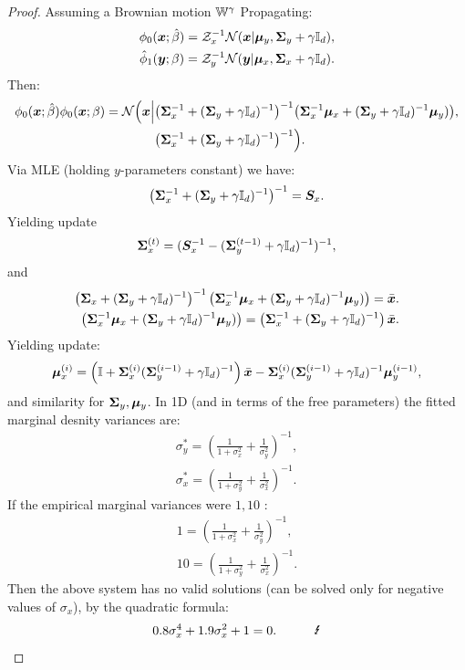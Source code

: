 \documentclass[a4paper,12pt,twoside,openright]{report}
\theoremstyle{definition}
\begin{document}
\begin{proof}
 Assuming a Brownian motion $\mathbb{W}^{\gamma}$ Propagating:
\begin{align*}
\phi_0( {\bm{x}} ; \hat{\beta}) = \mathcal{Z}_x^{-1} {\mathcal{N}}({\bm{x}}| {\bm{\mu}}_y, {\bm{\Sigma}}_y + \gamma {\mathbb{I}_d}),  \\
{{\hat{\phi}}}_1( {\bm{y}} ; {\beta}) = \mathcal{Z}_y^{-1}  {\mathcal{N}}({\bm{y}}| {\bm{\mu}}_x, {\bm{\Sigma}}_x + \gamma {\mathbb{I}_d}).
\end{align*}
Then:
\begin{align*}
 \phi_0( {\bm{x}} ; \hat{\beta})  \phi_0({\bm{x}} ; \beta) = {\mathcal{N}}\Big({\bm{x}} \Big|& \big({\bm{\Sigma}}_x^{-1} + ({\bm{\Sigma}}_y + \gamma {\mathbb{I}_d})^{-1}\big)^{-1}\big( {\bm{\Sigma}}_x^{-1}{\bm{\mu}}_x + ({\bm{\Sigma}}_y + \gamma {\mathbb{I}_d})^{-1}{\bm{\mu}}_y)\big), \\ &\big({\bm{\Sigma}}_x^{-1} + ({\bm{\Sigma}}_y + \gamma {\mathbb{I}_d})^{-1}\big)^{-1} \Big).
\end{align*}
Via MLE (holding $y$-parameters constant) we have:
\begin{align*}
\left({\bm{\Sigma}}_x^{-1} + ({\bm{\Sigma}}_y + \gamma {\mathbb{I}_d})^{-1}\right)^{-1}  = {\bm{S}}_x.
\end{align*}
Yielding update
\begin{align*}
{\bm{\Sigma}}_x^{(t)} = ({\bm{S}}_x^{-1}  - ({\bm{\Sigma}}_y^{(t-1)} + \gamma {\mathbb{I}_d})^{-1})^{-1} ,
\end{align*}
and 
\begin{align*}
\left({\bm{\Sigma}}_x + ({\bm{\Sigma}}_y + \gamma {\mathbb{I}_d})^{-1}\right)^{-1}\left( {\bm{\Sigma}}_x^{-1}{\bm{\mu}}_x + ({\bm{\Sigma}}_y + \gamma {\mathbb{I}_d})^{-1}{\bm{\mu}}_y)\right) = \bar{{\bm{x}}}. \\
\left( {\bm{\Sigma}}_x^{-1}{\bm{\mu}}_x + ({\bm{\Sigma}}_y + \gamma {\mathbb{I}_d})^{-1}{\bm{\mu}}_y)\right) = \left({\bm{\Sigma}}_x^{-1} + ({\bm{\Sigma}}_y + \gamma {\mathbb{I}_d})^{-1}\right)\bar{{\bm{x}}} .
\end{align*}
Yielding update:
\begin{align*}
{\bm{\mu}}_x^{(i)}  = \left(\mathbb{I} + {\bm{\Sigma}}_x^{(i)}({\bm{\Sigma}}_y^{(i-1)} + \gamma {\mathbb{I}_d})^{-1}\right)\bar{{\bm{x}}} -  {\bm{\Sigma}}_x^{(i)}({\bm{\Sigma}}_y^{(i-1)} + \gamma {\mathbb{I}_d})^{-1}{\bm{\mu}}_y^{(i-1)},
\end{align*}
and similarity  for ${\bm{\Sigma}}_y, {\bm{\mu}}_y$.
In 1D (and in terms of the free parameters) the fitted marginal desnity variances are:
\begin{align*}
\sigma_y^{*} = \left(\frac{1}{1+\sigma^2_x} + \frac{1}{\sigma^2_y}\right)^{-1} ,\\
\sigma_x^{*} = \left(\frac{1}{1+\sigma^2_y} + \frac{1}{\sigma^2_x}\right)^{-1}.
\end{align*}
If the empirical marginal variances were $1,10$ :
\begin{align*}
1 = \left(\frac{1}{1+\sigma^2_x} + \frac{1}{\sigma^2_y}\right)^{-1}, \\
10 = \left(\frac{1}{1+\sigma^2_y} + \frac{1}{\sigma^2_x}\right)^{-1}.
\end{align*}
Then the above system has no valid solutions (can be solved only for negative values of $\sigma_x$), by the quadratic formula:
\begin{align*}
0.8 \sigma_x^4 + 1.9 \sigma_x^2 + 1 = 0. \quad \quad \quad \text{\Lightning}
\end{align*}

\end{proof}
\end{document}
